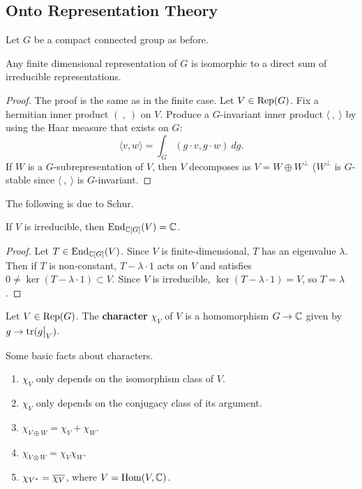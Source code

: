 \subsection{Onto Representation Theory}
Let $G$ be a compact connected group as before.

\begin{prop}
Any finite dimensional representation of $G$ is isomorphic to a direct sum of
irreducible representations.
\end{prop}

\begin{proof}
The proof is the same as in the finite case. Let $V \in \mathrm{Rep}(G)$. Fix a 
hermitian inner product $( \ , \ )$ on $V$. Produce a $G$-invariant inner product $\langle \ , \ \rangle$ by using the Haar measure that exists on $G$:
\[ \langle v, w \rangle = \int_G (g \cdot v, g \cdot w) \ dg. \]
If $W$ is a $G$-subrepresentation of $V$, then $V$ decomposes as
$V = W \oplus W^\perp$ ($W^\perp$ is $G$-stable since $\langle \ , \ \rangle$ is
$G$-invariant.
\end{proof}

The following is due to Schur.

\begin{cor}
If $V$ is irreducible, then $\operatorname{End}_{\mathbb{C}[G]}(V) = \mathbb{C}$.
\end{cor}

\begin{proof}
Let $T \in \operatorname{End}_{\mathbb{C}[G]}(V)$. Since $V$ is finite-dimensional, $T$ has an
eigenvalue $\lambda$. Then if $T$ is non-constant, $T - \lambda \cdot 1$ acts 
on $V$ and satisfies $0 \neq \ker(T - \lambda \cdot 1) \subset V$. Since $V$ is
irreducible, $\ker(T -\lambda \cdot 1) = V$, so $T = \lambda$.
\end{proof}

\begin{defn}
Let $V \in \mathrm{Rep}(G)$. The \textbf{character} $\chi_V$ of $V$ is a homomorphism
$G \rightarrow \mathbb{C}$ given by $g \rightarrow \tr(\restr{g}{V})$.
\end{defn}

Some basic facts about characters.

\begin{enumerate}[1.]
\item $\chi_V$ only depends on the isomorphism class of $V$.
\item $\chi_V$ only depends on the conjugacy class of its argument.
\item $\chi_{V \oplus W} = \chi_V + \chi_W$.
\item $\chi_{V \otimes W} = \chi_V \chi_W$.
\item $\chi_{V^*} = \overline{\chi_V}$, where $V = \operatorname{Hom}(V, \mathbb{C})$.
\end{enumerate}

